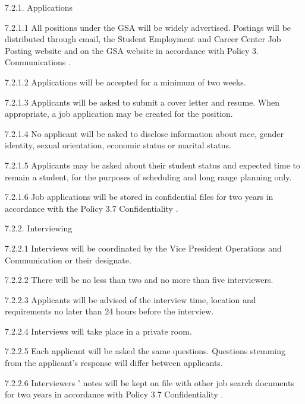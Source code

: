  7.2.1. Applications 
 
 
 
 7.2.1.1 All positions under the GSA will be widely advertised. 
 Postings will be distributed through email, the Student Employment 
 and Career Center Job Posting website and on the GSA website in 
 accordance with Policy 3. Communications . 
 
 
 
 7.2.1.2 Applications will be accepted for a minimum of two weeks. 
 
 
 
 7.2.1.3 Applicants will be asked to submit a cover letter and resume. When 
 appropriate, a job application may be created for the position. 
 
 
 
 7.2.1.4 No applicant will be asked to disclose information about race, 
 gender identity, sexual orientation, economic status or marital status. 
 
 
 
 7.2.1.5 Applicants may be asked about their student status and expected 
 time to remain a student, for the purposes of scheduling and long 
 range planning only. 
 
 
 
 7.2.1.6 Job applications will be stored in confidential files for two years 
 in accordance with the Policy 3.7 Confidentiality . 
 
 7.2.2. Interviewing 
 
 7.2.2.1 Interviews will be coordinated by the Vice President 
 Operations and Communication or their designate. 
 
 
 
 7.2.2.2 There will be no less than two and no more than five interviewers. 
 
 
 
 7.2.2.3 Applicants will be advised of the interview time, location and 
 requirements no later than 24 hours before the interview. 
 
 
 
 7.2.2.4 Interviews will take place in a private room. 
 
 
 
 7.2.2.5 Each applicant will be asked the same questions. Questions 
 stemming from the applicant’s response will differ between applicants. 
 
 
 
 7.2.2.6 Interviewers ’ notes will be kept on file with other job search 
 documents for two years in accordance with Policy 3.7 Confidentiality . 
 
